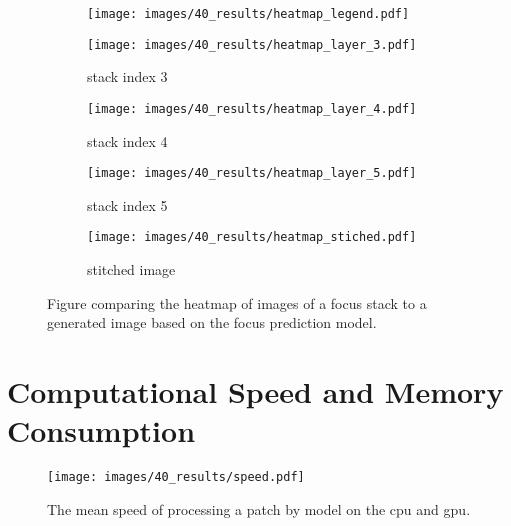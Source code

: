 \begin{figure}
    \centering
    \begin{subfigure}[b]{\textwidth}
        \centering
        \texttt{[image: images/40\_results/heatmap\_legend.pdf]}
    \end{subfigure}
    \begin{subfigure}[b]{0.5\textwidth}
        \centering
        \caption{stack index 3}
        \texttt{[image: images/40\_results/heatmap\_layer\_3.pdf]}
        \label{fig:Results:Stack:HeatMap:Stack3}
    \end{subfigure}%
    \begin{subfigure}[b]{0.5\textwidth}
        \centering
        \caption{stack index 4}
        \texttt{[image: images/40\_results/heatmap\_layer\_4.pdf]}
        \label{fig:Results:Stack:HeatMap:Stack4}
    \end{subfigure}
    \par
    \begin{subfigure}[b]{0.5\textwidth}
        \centering
        \caption{stack index 5}
        \texttt{[image: images/40\_results/heatmap\_layer\_5.pdf]}
        \label{fig:Results:Stack:HeatMap:Stack5}
    \end{subfigure}%
    \begin{subfigure}[b]{0.5\textwidth}
        \centering
        \caption{stitched image}
        \texttt{[image: images/40\_results/heatmap\_stiched.pdf]}
        \label{fig:Results:Stack:HeatMap:Stiched}
    \end{subfigure}
    \caption{Figure comparing the heatmap of images of a focus stack to a generated image based on the focus prediction model.}
    \label{fig:Results:Stack:HeatMap}
\end{figure}


\section{Computational Speed and Memory Consumption}
\label{sec:Results:Computation}

\begin{figure}
    \centering
    \texttt{[image: images/40\_results/speed.pdf]}
    \caption{The mean speed of processing a patch by model on the \ac{cpu} and \ac{gpu}.}
    \label{fig:Results:Computation:Speed}
\end{figure}

